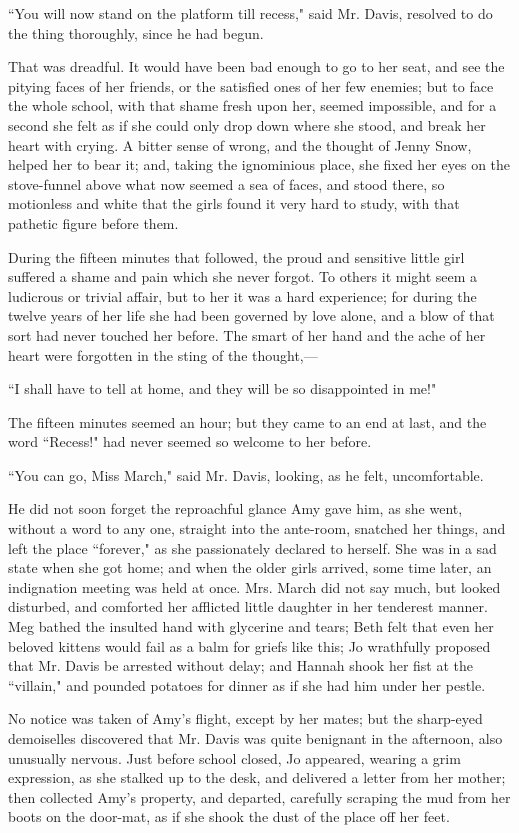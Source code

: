 ``You will now stand on the platform till recess," said Mr. Davis,
resolved to do the thing thoroughly, since he had begun.

That was dreadful. It would have been bad enough to go to her seat, and
see the pitying faces of her friends, or the satisfied ones of her few
enemies; but to face the whole school, with that shame fresh upon her,
seemed impossible, and for a second she felt as if she could only drop
down where she stood, and break her heart with crying. A bitter sense of
wrong, and the thought of Jenny Snow, helped her to bear it; and, taking
the ignominious place, she fixed her eyes on the stove-funnel above what
now seemed a sea of faces, and stood there, so motionless and white that
the girls found it very hard to study, with that pathetic figure before
them.

During the fifteen minutes that followed, the proud and sensitive little
girl suffered a shame and pain which she never forgot. To others it
might seem a ludicrous or trivial affair, but to her it was a hard
experience; for during the twelve years of her life she had been
governed by love alone, and a blow of that sort had never touched her
before. The smart of her hand and the ache of her heart were forgotten
in the sting of the thought,---

``I shall have to tell at home, and they will be so disappointed in me!"

The fifteen minutes seemed an hour; but they came to an end at last, and
the word ``Recess!" had never seemed so welcome to her before.

``You can go, Miss March," said Mr. Davis, looking, as he felt,
uncomfortable.

He did not soon forget the reproachful glance Amy gave him, as she went,
without a word to any one, straight into the ante-room, snatched her
things, and left the place ``forever," as she passionately declared to
herself. She was in a sad state when she got home; and when the older
girls arrived, some time later, an indignation meeting was held at once.
Mrs. March did not say much, but looked disturbed, and comforted her
afflicted little daughter in her tenderest manner. Meg bathed the
insulted hand with glycerine and tears; Beth felt that even her beloved
kittens would fail as a balm for griefs like this; Jo wrathfully
proposed that Mr. Davis be arrested without delay; and Hannah shook her
fist at the ``villain," and pounded potatoes for dinner as if she had him
under her pestle.

No notice was taken of Amy's flight, except by her
mates; but the sharp-eyed demoiselles discovered that Mr. Davis was
quite benignant in the afternoon, also unusually nervous. Just before
school closed, Jo appeared, wearing a grim expression, as she stalked up
to the desk, and delivered a letter from her mother; then collected
Amy's property, and departed, carefully scraping the mud
from her boots on the door-mat, as if she shook the dust of the place
off her feet.

